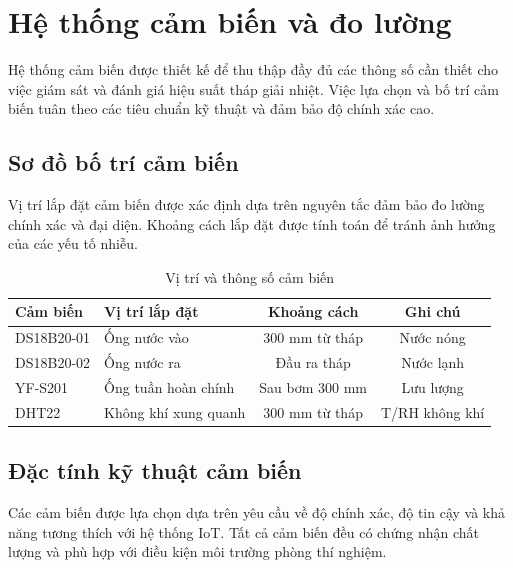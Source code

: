 \documentclass[../main.tex]{subfiles}
\begin{document}
\section{Hệ thống cảm biến và đo lường}
\label{sec:sensor_measurement_system}

Hệ thống cảm biến được thiết kế để thu thập đầy đủ các thông số cần thiết cho việc giám sát và đánh giá hiệu suất tháp giải nhiệt. Việc lựa chọn và bố trí cảm biến tuân theo các tiêu chuẩn kỹ thuật và đảm bảo độ chính xác cao.

\subsection{Sơ đồ bố trí cảm biến}
\label{sec:sensor_locations}

Vị trí lắp đặt cảm biến được xác định dựa trên nguyên tắc đảm bảo đo lường chính xác và đại diện. Khoảng cách lắp đặt được tính toán để tránh ảnh hưởng của các yếu tố nhiễu.

\begin{table}[H]
\centering
\renewcommand{\arraystretch}{1.1}
\caption{Vị trí và thông số cảm biến}
\label{tab:sensor_locations}
\begin{tabular}{|l|l|c|c|}
\hline
\textbf{Cảm biến} & \textbf{Vị trí lắp đặt} & \textbf{Khoảng cách} & \textbf{Ghi chú} \\
\hline
DS18B20-01 & Ống nước vào & 300 mm từ tháp & Nước nóng \\
\hline
DS18B20-02 & Ống nước ra & Đầu ra tháp & Nước lạnh \\
\hline
YF-S201 & Ống tuần hoàn chính & Sau bơm 300 mm & Lưu lượng \\
\hline
DHT22 & Không khí xung quanh & 300 mm từ tháp & T/RH không khí \\
\hline
\end{tabular}
\end{table}

\subsection{Đặc tính kỹ thuật cảm biến}
\label{sec:sensor_specifications}

Các cảm biến được lựa chọn dựa trên yêu cầu về độ chính xác, độ tin cậy và khả năng tương thích với hệ thống IoT. Tất cả cảm biến đều có chứng nhận chất lượng và phù hợp với điều kiện môi trường phòng thí nghiệm.
\end{document}
